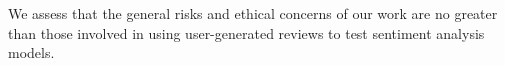 We assess that the general risks and ethical concerns of our work are no greater than those involved in using user-generated reviews to test sentiment analysis models.






